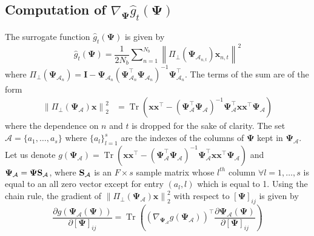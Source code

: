 \documentclass[a4paper,12pt,openany]{book}
\newcommand{\dict}{\boldsymbol{\Psi}}
\newcommand{\I}{\mathbf{I}}
\let\oldS\S
\renewcommand{\S}{\ifmmode\mathbf{S}\else\oldS\fi}
\newcommand{\x}{\mathbf{x}}
\newcommand{\norm}[1]{\left\|#1\right\|}
\DeclareMathOperator{\Tr}{Tr}
\begin{document}
\newpage

\medskip



\clearpage
\newpage

\begin{appendices}

\section{Computation of $\nabla_{\dict} \hat{g}_t(\dict)$}
\label{app:gradient_g_t_dict}

The surrogate function $\hat{g}_t(\dict)$ is given by
\begin{equation}\label{eq:funcionh_app}
	\hat{g}_t(\dict) = \frac{1}{2N_b}\sum\nolimits_{n=1}^{N_b} \norm{ \Pi_\perp(\dict_{\mathcal{A}_{n,t}})\x_{n,t}}^2 
\end{equation} 
where $\Pi_\perp(\dict_{\mathcal{A}_n})= \I -\dict_{\mathcal{A}_n}(\dict^\top_{\mathcal{A}_n}\dict_{\mathcal{A}_n})^{-1}\dict^\top_{\mathcal{A}_n}$. The terms of the sum are of the form
\begin{align}
	\norm{ \Pi_\perp(\dict_{\mathcal{A}})\x}_2^2 &=\Tr(\x\x^\top-(\dict^\top_{\mathcal{A}}\dict_{\mathcal{A}})^{-1}\dict^\top_{\mathcal{A}}\x\x^\top\dict_{\mathcal{A}}) \nonumber %
\end{align}
where the dependence on $n$ and $t$ is dropped for the sake of clarity. The set $\mathcal{A}=\{a_1,\ldots,a_s\}$ where $\{a_l\}_{l=1}^s$ are the indexes of the columns of $\dict$ kept in $\dict_\mathcal{A}$. Let us denote $g(\dict_\mathcal{A})=\Tr(\x\x^\top-(\dict_\mathcal{A}^\top\dict_\mathcal{A})^{-1}\dict_\mathcal{A}^\top \x\x^\top\dict_\mathcal{A})$ and $\dict_\mathcal{A}=\dict\S_\mathcal{A}$, where $\S_\mathcal{A}$ is an $F \times s$ sample matrix whose $l^{th}$ column $\forall l=1,\ldots,s$ is equal to an all zero vector except for entry $(a_l,l)$ which is equal to 1. Using the chain rule, the gradient of $\norm{ \Pi_\perp(\dict_{\mathcal{A}})\x}_2^2$ with respect to $[\dict]_{ij}$ is given by
\begin{equation}\label{eq:gradchainrule}
	\frac{\partial g(\dict_\mathcal{A}(\dict))}{\partial [\dict]_{ij}}=\Tr \left(\left(\nabla_{\dict_\mathcal{A}}g(\dict_\mathcal{A}) \right)^\top\frac{\partial \dict_\mathcal{A}(\dict)}{\partial [\dict]_{ij}}\right)

\end{equation}
\end{appendices}
\end{document}

